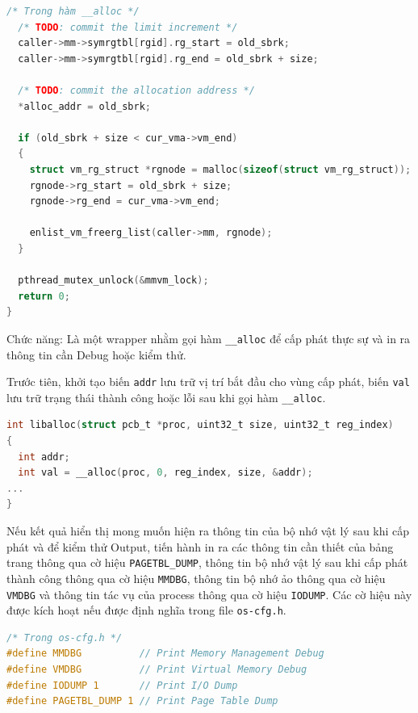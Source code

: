 \pagebreak
\begin{lstlisting}[style=Cstyle,language=C]
/* Trong hàm __alloc */
  /* TODO: commit the limit increment */
  caller->mm->symrgtbl[rgid].rg_start = old_sbrk;
  caller->mm->symrgtbl[rgid].rg_end = old_sbrk + size;

  /* TODO: commit the allocation address */
  *alloc_addr = old_sbrk;

  if (old_sbrk + size < cur_vma->vm_end)
  {
    struct vm_rg_struct *rgnode = malloc(sizeof(struct vm_rg_struct));
    rgnode->rg_start = old_sbrk + size;
    rgnode->rg_end = cur_vma->vm_end;

    enlist_vm_freerg_list(caller->mm, rgnode);
  }

  pthread_mutex_unlock(&mmvm_lock);
  return 0;
}
\end{lstlisting} 


Chức năng: Là một wrapper nhằm gọi hàm \texttt{\_\_alloc} để cấp phát thực sự và in ra thông tin cần Debug hoặc kiểm thử.

Trước tiên, khởi tạo biến \texttt{addr} lưu trữ vị trí bắt đầu cho vùng cấp phát, biến \texttt{val} lưu trữ trạng thái thành công hoặc lỗi sau khi gọi hàm \texttt{\_\_alloc}.

\begin{lstlisting}[style=Cstyle,language=C]
int liballoc(struct pcb_t *proc, uint32_t size, uint32_t reg_index)
{
  int addr;
  int val = __alloc(proc, 0, reg_index, size, &addr);
...
}
\end{lstlisting} 

Nếu kết quả hiển thị mong muốn hiện ra thông tin của bộ nhớ vật lý sau khi cấp phát và để kiểm thử Output, tiến hành in ra các thông tin cần thiết của bảng trang thông qua cờ hiệu \texttt{PAGETBL\_DUMP}, thông tin bộ nhớ vật lý sau khi cấp phát thành công thông qua cờ hiệu \texttt{MMDBG}, thông tin bộ nhớ ảo thông qua cờ hiệu \texttt{VMDBG} và thông tin tác vụ của process thông qua cờ hiệu \texttt{IODUMP}. Các cờ hiệu này được kích hoạt nếu được định nghĩa trong file \texttt{os-cfg.h}.

\begin{lstlisting}[style=Cstyle,language=C]
/* Trong os-cfg.h */
#define MMDBG          // Print Memory Management Debug
#define VMDBG          // Print Virtual Memory Debug
#define IODUMP 1       // Print I/O Dump
#define PAGETBL_DUMP 1 // Print Page Table Dump
\end{lstlisting} 
\pagebreak

